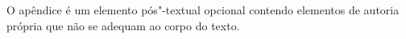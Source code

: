 O apêndice é um elemento pós"-textual opcional contendo elementos de autoria própria que não se adequam ao corpo do texto.
